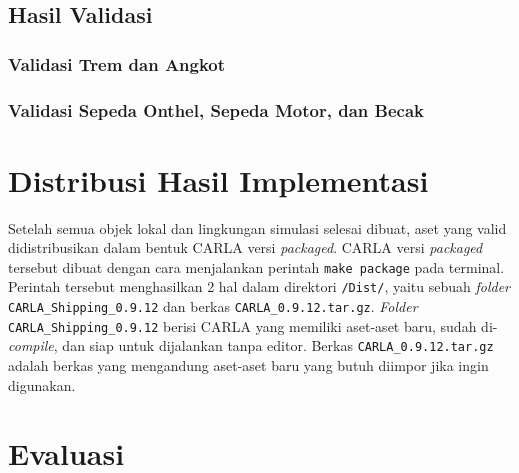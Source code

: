 \subsection{Hasil Validasi}


\subsubsection{Validasi Trem dan Angkot}


\subsubsection{Validasi Sepeda Onthel, Sepeda Motor, dan Becak}


\section{Distribusi Hasil Implementasi}

Setelah semua objek lokal dan lingkungan simulasi selesai dibuat, aset yang
valid didistribusikan dalam bentuk CARLA versi \textit{packaged}. CARLA versi
\textit{packaged} tersebut dibuat dengan cara menjalankan perintah \verb|make package|
pada terminal. Perintah tersebut menghasilkan 2 hal dalam direktori
\verb|/Dist/|, yaitu sebuah \textit{folder} \verb|CARLA_Shipping_0.9.12| dan
berkas \verb|CARLA_0.9.12.tar.gz|. \textit{Folder} \verb|CARLA_Shipping_0.9.12|
berisi CARLA yang memiliki aset-aset baru, sudah di-\textit{compile}, dan siap
untuk dijalankan tanpa editor. Berkas \verb|CARLA_0.9.12.tar.gz| adalah berkas
yang mengandung aset-aset baru yang butuh diimpor jika ingin digunakan.

\section{Evaluasi}

